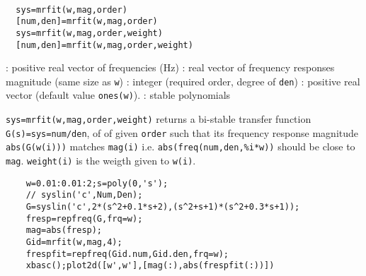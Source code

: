 \begin{mandesc}
   \\ %
\end{mandesc}
\begin{calling_sequence}
\begin{verbatim}
  sys=mrfit(w,mag,order)  
  [num,den]=mrfit(w,mag,order)  
  sys=mrfit(w,mag,order,weight)  
  [num,den]=mrfit(w,mag,order,weight)  
\end{verbatim}
\end{calling_sequence}
\begin{parameters}
  \begin{varlist}
    : positive real vector of frequencies (Hz)
    : real vector of frequency responses magnitude (same size as \verb!w!)
    : integer (required order, degree of \verb!den!)
    : positive real vector (default value \verb!ones(w)!).
    : stable polynomials
  \end{varlist}
\end{parameters}
\begin{mandescription}
  \verb!sys=mrfit(w,mag,order,weight)! returns a bi-stable transfer function
  \verb!G(s)=sys=num/den!, of of given \verb!order! such that 
  its frequency response magnitude \verb!abs(G(w(i)))! 
  matches \verb!mag(i)! i.e. \verb!abs(freq(num,den,%i*w))! should be 
  close to \verb!mag!.
  \verb!weight(i)! is the weigth given to \verb!w(i)!.
\end{mandescription}
\begin{examples}
  \begin{Verbatim}
    w=0.01:0.01:2;s=poly(0,'s');
    // syslin('c',Num,Den);
    G=syslin('c',2*(s^2+0.1*s+2),(s^2+s+1)*(s^2+0.3*s+1)); 
    fresp=repfreq(G,frq=w);
    mag=abs(fresp);
    Gid=mrfit(w,mag,4);
    frespfit=repfreq(Gid.num,Gid.den,frq=w);
    xbasc();plot2d([w',w'],[mag(:),abs(frespfit(:))])
  \end{Verbatim}
\end{examples}
\begin{manseealso}
       
\end{manseealso}
